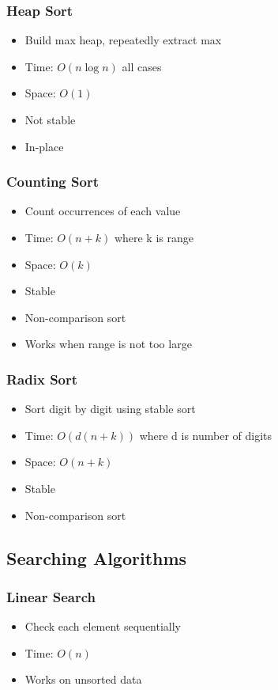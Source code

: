 \documentclass[11pt,a4paper]{article}
\begin{document}
\subsubsection{Heap Sort}
\begin{itemize}
    \item Build max heap, repeatedly extract max
    \item Time: $O(n \log n)$ all cases
    \item Space: $O(1)$
    \item Not stable
    \item In-place
\end{itemize}

\subsubsection{Counting Sort}
\begin{itemize}
    \item Count occurrences of each value
    \item Time: $O(n + k)$ where k is range
    \item Space: $O(k)$
    \item Stable
    \item Non-comparison sort
    \item Works when range is not too large
\end{itemize}

\subsubsection{Radix Sort}
\begin{itemize}
    \item Sort digit by digit using stable sort
    \item Time: $O(d(n + k))$ where d is number of digits
    \item Space: $O(n + k)$
    \item Stable
    \item Non-comparison sort
\end{itemize}

\subsection{Searching Algorithms}

\subsubsection{Linear Search}
\begin{itemize}
    \item Check each element sequentially
    \item Time: $O(n)$
    \item Works on unsorted data
\end{itemize}
\end{document}
